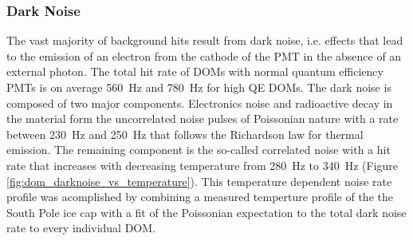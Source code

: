 \subsubsection{Dark Noise}


The vast majority of background hits result from dark noise, i.e. effects that lead to the emission of an electron from the cathode of the PMT in the absence of an external photon. The total hit rate of DOMs with normal quantum efficiency PMTs is on average \SI{560}{\hertz} and \SI{780}{\hertz} for high QE DOMs. 
The dark noise is composed of two major components. Electronics noise and radioactive decay in the material form the uncorrelated noise pulses of Poissonian nature with a rate between \SI{230}{\hertz} and \SI{250}{\hertz} that follows the Richardson law for thermal emission. 
The remaining component is the so-called correlated noise
with a hit rate that increases with decreasing temperature from \SI{280}{\hertz} to \SI{340}{\hertz} (Figure \ref{fig:dom_darknoise_vs_temperature}). 
This temperature dependent noise rate profile was acomplished by combining a measured temperture profile of the the South Pole ice cap \cite{price2002temperature} with a fit of the Poissonian expectation to the total dark noise rate to every individual DOM.

